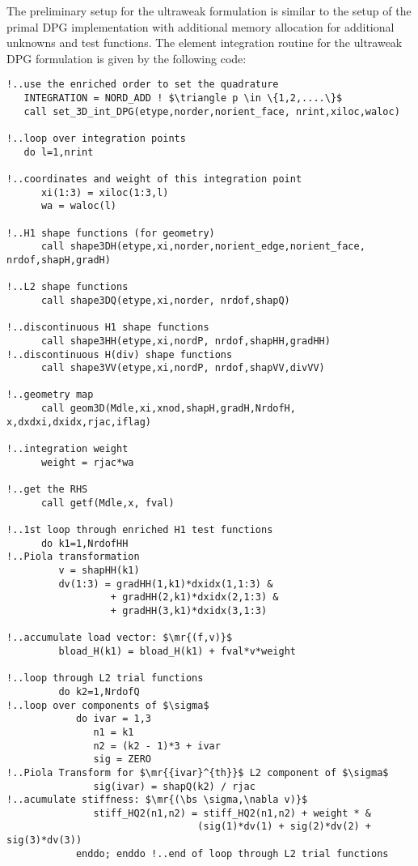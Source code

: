 The preliminary setup for the ultraweak formulation is similar to the setup of the primal DPG implementation with additional memory allocation for additional unknowns and test functions. The element integration routine for the ultraweak DPG formulation is given by the following code:
\begin{lstlisting}[mathescape,caption=\file{POISSON/ULTRAWEAK\_DPG/}\routine{elem}: element integration]
!..use the enriched order to set the quadrature
   INTEGRATION = NORD_ADD ! $\triangle p \in \{1,2,....\}$
   call set_3D_int_DPG(etype,norder,norient_face, nrint,xiloc,waloc)

!..loop over integration points
   do l=1,nrint

!..coordinates and weight of this integration point
      xi(1:3) = xiloc(1:3,l)
      wa = waloc(l)

!..H1 shape functions (for geometry)
      call shape3DH(etype,xi,norder,norient_edge,norient_face, nrdof,shapH,gradH)

!..L2 shape functions
      call shape3DQ(etype,xi,norder, nrdof,shapQ)

!..discontinuous H1 shape functions
      call shape3HH(etype,xi,nordP, nrdof,shapHH,gradHH)
!..discontinuous H(div) shape functions
      call shape3VV(etype,xi,nordP, nrdof,shapVV,divVV)

!..geometry map
      call geom3D(Mdle,xi,xnod,shapH,gradH,NrdofH, x,dxdxi,dxidx,rjac,iflag)

!..integration weight
      weight = rjac*wa

!..get the RHS
      call getf(Mdle,x, fval)

!..1st loop through enriched H1 test functions
      do k1=1,NrdofHH
!..Piola transformation
         v = shapHH(k1)
         dv(1:3) = gradHH(1,k1)*dxidx(1,1:3) &
                  + gradHH(2,k1)*dxidx(2,1:3) &
                  + gradHH(3,k1)*dxidx(3,1:3)

!..accumulate load vector: $\mr{(f,v)}$
         bload_H(k1) = bload_H(k1) + fval*v*weight

!..loop through L2 trial functions
         do k2=1,NrdofQ
!..loop over components of $\sigma$
            do ivar = 1,3
               n1 = k1
               n2 = (k2 - 1)*3 + ivar
               sig = ZERO
!..Piola Transform for $\mr{{ivar}^{th}}$ L2 component of $\sigma$
               sig(ivar) = shapQ(k2) / rjac
!..acumulate stiffness: $\mr{(\bs \sigma,\nabla v)}$
               stiff_HQ2(n1,n2) = stiff_HQ2(n1,n2) + weight * &
               	                 (sig(1)*dv(1) + sig(2)*dv(2) + sig(3)*dv(3))
            enddo; enddo !..end of loop through L2 trial functions


\end{lstlisting}
